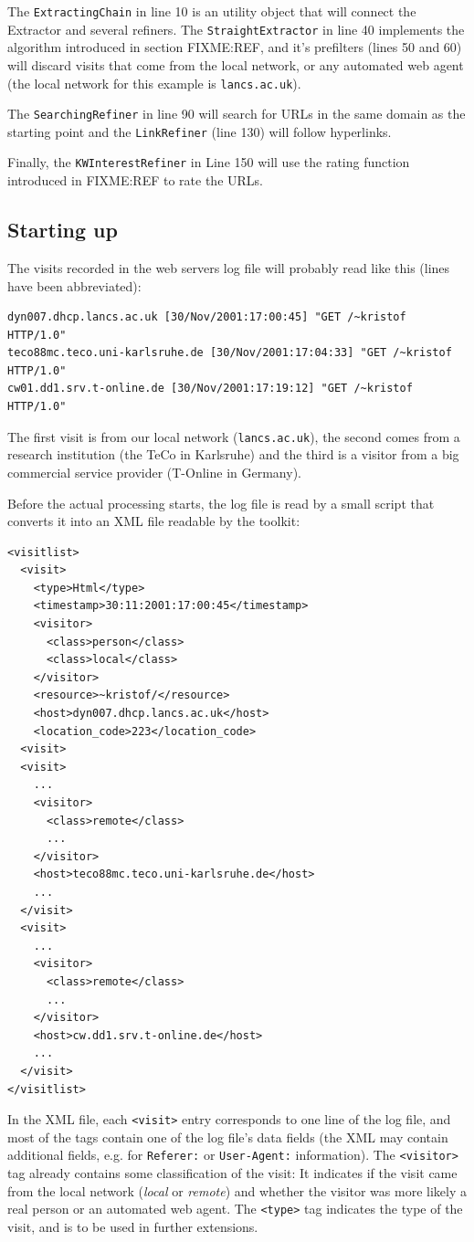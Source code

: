\documentclass[a4paper]{danarticle}
\theoremstyle{remark}
\begin{document}
      The \verb$ExtractingChain$ in line 10 is an utility object that will 
      connect the Extractor and several refiners. The \verb$StraightExtractor$ 
      in line 40 implements the algorithm introduced in section FIXME:REF, and 
      it's prefilters (lines 50 and 60) will discard visits that come from the 
      local network, or any automated web agent (the local network for this
      example is \verb$lancs.ac.uk$).
      
      The \verb$SearchingRefiner$ in line 90 will search for URLs in the same 
      domain as the starting point and the \verb$LinkRefiner$ (line 130) will 
      follow hyperlinks.
      
      Finally, the \verb$KWInterestRefiner$ in Line 150 will use the rating 
      function introduced in FIXME:REF to rate the URLs.
    \subsection*{Starting up}
      The visits recorded in the web servers log file will probably read
      like this (lines have been abbreviated):
      \begin{verbatim}
dyn007.dhcp.lancs.ac.uk [30/Nov/2001:17:00:45] "GET /~kristof HTTP/1.0"
teco88mc.teco.uni-karlsruhe.de [30/Nov/2001:17:04:33] "GET /~kristof HTTP/1.0"
cw01.dd1.srv.t-online.de [30/Nov/2001:17:19:12] "GET /~kristof HTTP/1.0"
      \end{verbatim}
      The first visit is from our local network (\verb$lancs.ac.uk$), the
      second comes from a research institution (the TeCo in Karlsruhe) and the
      third is a visitor from a big commercial service provider (T-Online in
      Germany).
      
      Before the actual processing starts, the log file is read by a small
      script that converts it into an XML file readable by the toolkit:
      \begin{verbatim}
<visitlist>
  <visit>
    <type>Html</type>
    <timestamp>30:11:2001:17:00:45</timestamp>
    <visitor>
      <class>person</class>
      <class>local</class>
    </visitor>
    <resource>~kristof/</resource>
    <host>dyn007.dhcp.lancs.ac.uk</host>
    <location_code>223</location_code>
  <visit>
  <visit>
    ...
    <visitor>
      <class>remote</class>
      ...
    </visitor>
    <host>teco88mc.teco.uni-karlsruhe.de</host>
    ...
  </visit>
  <visit>
    ...
    <visitor>
      <class>remote</class>
      ...
    </visitor>
    <host>cw.dd1.srv.t-online.de</host>
    ...
  </visit>
</visitlist>
      \end{verbatim}
      In the XML file, each \verb$<visit>$ entry corresponds to one line of the
      log file, and most of the tags contain one of the log file's data fields
      (the XML may contain additional fields, e.g. for \verb$Referer:$ or 
      \verb$User-Agent:$ information). The \verb$<visitor>$ tag already
      contains some classification of the visit: It indicates if the visit came
      from the local network (\textit{local} or \textit{remote}) and whether the
      visitor was more likely a real person or an automated web agent. The
      \verb$<type>$ tag indicates the type of the visit, and is to be used in
      further extensions.
\end{document}

